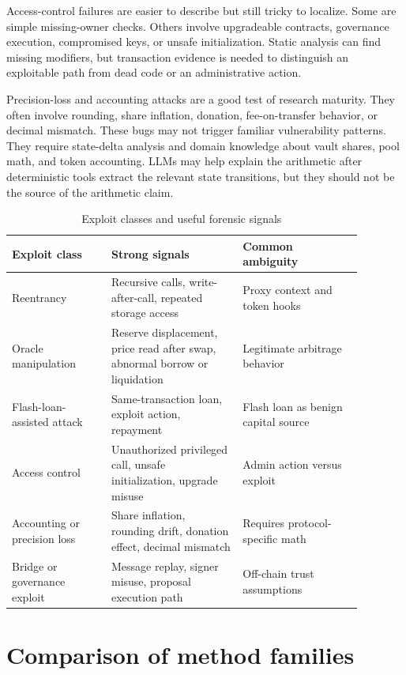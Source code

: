 \documentclass[conference]{IEEEtran}
\begin{document}
Access-control failures are easier to describe but still tricky to localize. Some are simple missing-owner checks. Others involve upgradeable contracts, governance execution, compromised keys, or unsafe initialization. Static analysis can find missing modifiers, but transaction evidence is needed to distinguish an exploitable path from dead code or an administrative action.

Precision-loss and accounting attacks are a good test of research maturity. They often involve rounding, share inflation, donation, fee-on-transfer behavior, or decimal mismatch. These bugs may not trigger familiar vulnerability patterns. They require state-delta analysis and domain knowledge about vault shares, pool math, and token accounting. LLMs may help explain the arithmetic after deterministic tools extract the relevant state transitions, but they should not be the source of the arithmetic claim.

\begin{table}[t]
\caption{Exploit classes and useful forensic signals}
\label{tab:signals}
\centering
\small
\begin{tabular}{p{0.25\linewidth}p{0.33\linewidth}p{0.30\linewidth}}
\toprule
Exploit class & Strong signals & Common ambiguity \\
\midrule
Reentrancy & Recursive calls, write-after-call, repeated storage access & Proxy context and token hooks \\
Oracle manipulation & Reserve displacement, price read after swap, abnormal borrow or liquidation & Legitimate arbitrage behavior \\
Flash-loan-assisted attack & Same-transaction loan, exploit action, repayment & Flash loan as benign capital source \\
Access control & Unauthorized privileged call, unsafe initialization, upgrade misuse & Admin action versus exploit \\
Accounting or precision loss & Share inflation, rounding drift, donation effect, decimal mismatch & Requires protocol-specific math \\
Bridge or governance exploit & Message replay, signer misuse, proposal execution path & Off-chain trust assumptions \\
\bottomrule
\end{tabular}
\end{table}

\section{Comparison of method families}
\end{document}
